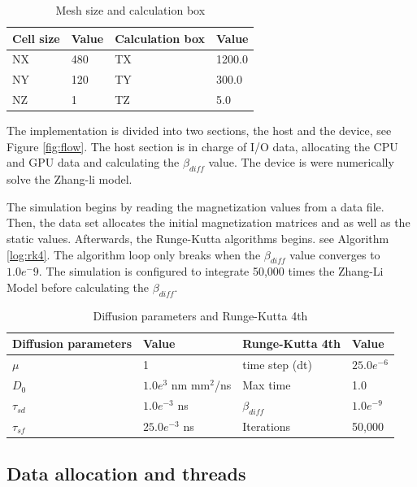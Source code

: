 \begin{table}[h]
\centering
\begin{tabular}{| l | l | l | l |}
\hline
Cell size & Value & Calculation box & Value \\
\hline
 NX & 480 &  TX  & 1200.0   \\
\hline
 NY & 120 &  TY  & 300.0  \\
\hline
 NZ &	1 &  TZ  & 5.0   \\
\hline
\end{tabular}
\caption{Mesh size and calculation box}
\label{tab:mesh}
\end{table}

The implementation is divided into two sections, the host and the device, see Figure \ref{fig:flow}. The host section is in charge of I/O data, allocating the CPU and GPU data and calculating the $\beta_{diff}$ value. The device is were numerically solve the Zhang-li model.

The simulation begins by reading the magnetization values from a data file. Then, the data set allocates the initial magnetization matrices and as well as the static values. Afterwards, the Runge-Kutta algorithms begins. see Algorithm \ref{log:rk4}. The algorithm loop only breaks when the $\beta_{diff}$ value converges to $1.0e^-9$. The simulation is configured to integrate 50,000 times the Zhang-Li Model before calculating the $\beta_{diff}$.

\begin{table}[h]
\centering
\begin{tabular}{| l | l | l | l |}
\hline
Diffusion parameters& Value & Runge-Kutta 4th & Value \\
\hline 
$\mu$ & 1 &  time step (dt) &   $25.0e^{-6}$   \\
\hline
$D_{0}$ & $1.0e^{3}$ nm mm$^2$/ns  & Max time  & 1.0  \\
\hline
$\tau_{sd}$ & $1.0e^{-3}$ ns  & $\beta_{diff}$ & $1.0e^{-9}$ \\
\hline
$\tau_{sf}$ & $25.0e^{-3}$ ns  & Iterations & 50,000 \\
\hline
\end{tabular}
\caption{Diffusion parameters and Runge-Kutta 4th}
\label{tab:drk}
\end{table}

\subsection{Data allocation and threads}


